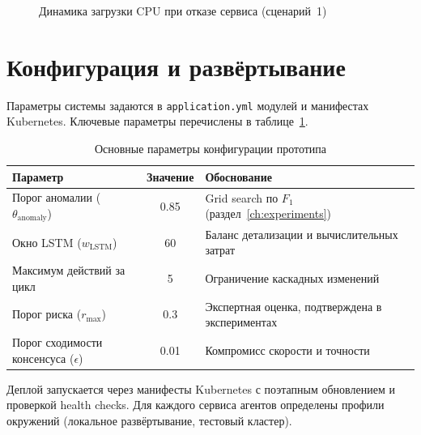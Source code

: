 \begin{figure}[H]
\centering
{}
\caption{Динамика загрузки CPU при отказе сервиса (сценарий~1)}
\label{fig:recovery_scenario}
\end{figure}

\section{Конфигурация и развёртывание}

Параметры системы задаются в \texttt{application.yml} модулей и манифестах Kubernetes. Ключевые параметры перечислены в таблице~\ref{tab:prototype_params}.

\begin{table}[H]
\centering
\small
\caption{Основные параметры конфигурации прототипа}
\label{tab:prototype_params}
\begin{tabular}{|p{5cm}|c|p{5cm}|}
\hline
\textbf{Параметр} & \textbf{Значение} & \textbf{Обоснование} \\
\hline
Порог аномалии ($\theta_{\text{anomaly}}$) & 0.85 & Grid search по $F_1$ (раздел~\ref{ch:experiments}) \\
\hline
Окно LSTM ($w_{\text{LSTM}}$) & 60 & Баланс детализации и вычислительных затрат \\
\hline
Максимум действий за цикл & 5 & Ограничение каскадных изменений \\
\hline
Порог риска ($r_{\max}$) & 0.3 & Экспертная оценка, подтверждена в экспериментах \\
\hline
Порог сходимости консенсуса ($\epsilon$) & 0.01 & Компромисс скорости и точности \\
\hline
\end{tabular}
\end{table}

Деплой запускается через манифесты Kubernetes с поэтапным обновлением и проверкой health checks. Для каждого сервиса агентов определены профили окружений (локальное развёртывание, тестовый кластер).

